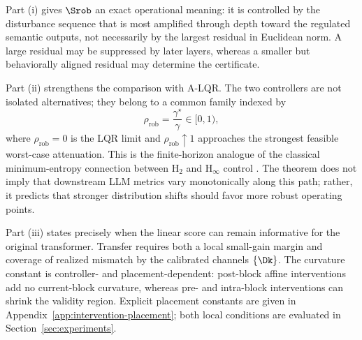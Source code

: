 Part (i) gives $\Srob$ an exact operational meaning: it is controlled by
the disturbance sequence that is most amplified through depth toward the
regulated semantic outputs, not necessarily by the largest residual in
Euclidean norm.  A large residual may be suppressed by later layers, whereas a
smaller but behaviorally aligned residual may determine the certificate.

Part (ii) strengthens the comparison with A-LQR.  The two controllers are not
isolated alternatives; they belong to a common family indexed by
$$
\rho_{\mathrm{rob}}
=
\frac{\gamma^\star}{\gamma}
\in[0,1),
$$
where $\rho_{\mathrm{rob}}=0$ is the LQR limit and
$\rho_{\mathrm{rob}}\uparrow1$ approaches the strongest feasible worst-case
attenuation.  This is the finite-horizon analogue of the classical
minimum-entropy connection between $\mathrm{H}_2$ and
$\mathrm{H}_{\infty}$ control
\citep{doyle1989state,iglesias1990discrete}.  The theorem does not imply that
downstream LLM metrics vary monotonically along this path; rather, it predicts
that stronger distribution shifts should favor more robust operating points.

Part (iii) states precisely when the linear score can remain informative for
the original transformer.  Transfer requires both a local small-gain margin
and coverage of realized mismatch by the calibrated channels $\{\Dk\}$.
The curvature constant is controller- and placement-dependent: post-block
affine interventions add no current-block curvature, whereas pre- and
intra-block interventions can shrink the validity region.  Explicit placement
constants are given in Appendix~\ref{app:intervention-placement}; both local
conditions are evaluated in Section~\ref{sec:experiments}.

